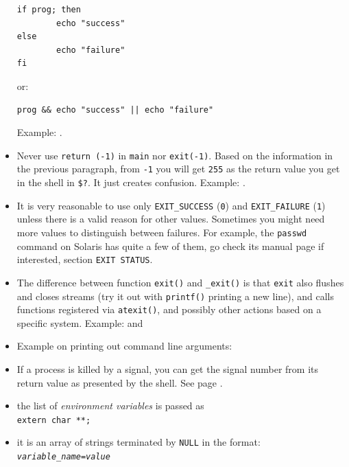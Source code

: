 \begin{itemize}
\begin{verbatim}
if prog; then
        echo "success"
else
        echo "failure"
fi
\end{verbatim}

or:

\begin{verbatim}
prog && echo "success" || echo "failure"
\end{verbatim}
Example: .
\item {} Never use \texttt{return (-1)} in \texttt{main} nor
\texttt{exit(-1)}.  Based on the information in the previous paragraph,
from \texttt{-1} you will get \texttt{255} as the return value you get in the
shell in \texttt{\$?}.  It just creates confusion.
Example: .
\item It is very reasonable to use only \texttt{EXIT\_SUCCESS} (\texttt{0}) and
\texttt{EXIT\_FAILURE} (\texttt{1}) unless there is a valid reason for other
values.  Sometimes you might need more values to distinguish between failures.
For example, the \texttt{passwd} command on Solaris has quite a few of them, go
check its manual page if interested, section \texttt{EXIT STATUS}.
\item The difference between function \texttt{exit()} and \verb#_exit()# is that
\texttt{exit} also flushes and closes streams (try it out with \texttt{printf()}
 printing a new line), and calls functions registered via
\texttt{atexit()}, and possibly other actions based on a specific system.
Example:  and 
\item {} Example on printing out command line arguments:
\item If a process is killed by a signal, you can get the signal number from its
return value as presented by the shell.  See page
\pageref{SHELLRETVALUEFORSIGNALS}.
\end{itemize}


\begin{slide}
\begin{itemize}
\item the list of \emph{environment
variables} is passed as\\ \texttt{extern char
**;}
\item it is an array of strings terminated by \texttt{NULL} in the
format: \texttt{\emph{variable\_name}=\emph{value}}
\end{itemize}
\begin{center}

\end{center}
\end{slide}

